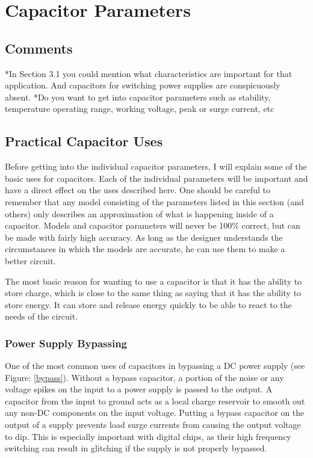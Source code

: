 \section {Capacitor Parameters}
\subsection{Comments}
*In Section 3.1 you could mention what characteristics are important for that application.  And capacitors for switching power supplies are conspicuously absent.
*Do you want to get into capacitor parameters such as stability, temperature operating range, working voltage, peak or surge current, etc

\subsection{Practical Capacitor Uses}

Before getting into the individual capacitor parameters, I will explain some of the basic uses for capacitors. Each of the individual parameters will be important and have a direct effect on the uses described here. One should be careful to remember that any model consisting of the parameters listed in this section (and others) only describes an approximation of what is happening inside of a capacitor. Models and capacitor parameters will never be 100\% correct, but can be made with fairly high accuracy. As long as the designer understands the circumstances in which the models are accurate, he can use them to make a better circuit.

The most basic reason for wanting to use a capacitor is that it has the ability to store charge, which is close to the same thing as saying that it has the ability to store energy. It can store and release energy quickly to be able to react to the needs of the circuit.

\subsubsection{Power Supply Bypassing}

One of the most common uses of capacitors in bypassing a DC power supply (see Figure: \ref{bypass}). Without a bypass capacitor, a portion of the noise or any voltage spikes on the input to a power supply is passed to the output. A capacitor from the input to ground acts as a local charge reservoir to smooth out any non-DC components on the input voltage. Putting a bypass capacitor on the output of a supply prevents load surge currents from causing the output voltage to dip. This is especially important with digital chips, as their high frequency switching can result in glitching if the supply is not properly bypassed.


